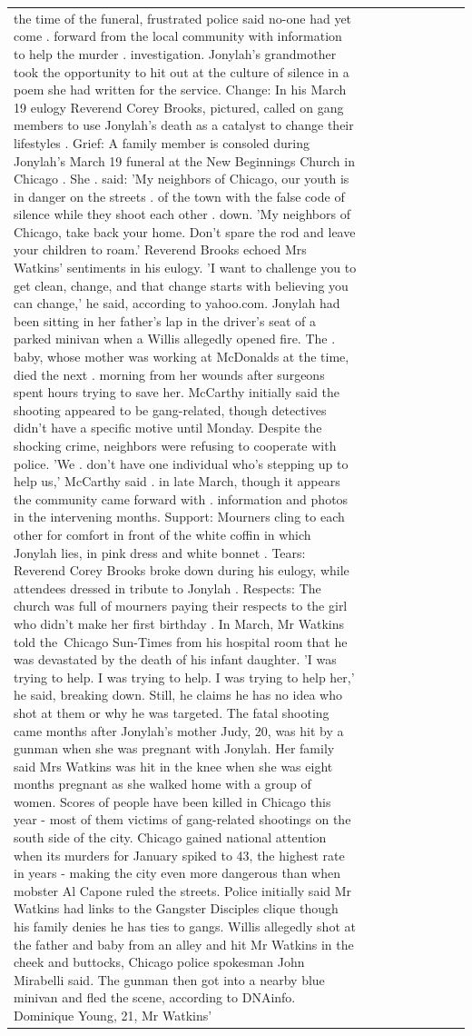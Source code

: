 \begin{table}[H]
\begin{tabular}{lllrlllll}
the time of the funeral, frustrated police said no-one had yet come . forward from the local community with information to help the murder . investigation. Jonylah's grandmother took the opportunity to hit out at the culture of silence in a poem she had written for the service. Change: In his March 19 eulogy Reverend Corey Brooks, pictured, called on gang members to use Jonylah's death as a catalyst to change their lifestyles . Grief: A family member is consoled during Jonylah's March 19 funeral at the New Beginnings Church in Chicago . She . said: 'My neighbors of Chicago, our youth is in danger on the streets . of the town with the false code of silence while they shoot each other . down. 'My neighbors of Chicago, take back your home. Don't spare the rod and leave your children to roam.' Reverend Brooks echoed Mrs Watkins' sentiments in his eulogy. 'I want to challenge you to get clean, change, and that change starts with believing you can change,' he said, according to yahoo.com. Jonylah had been sitting in her father's lap in the driver's seat of a parked minivan when a Willis allegedly opened fire. The . baby, whose mother was working at McDonalds at the time, died the next . morning from her wounds after surgeons spent hours trying to save her. McCarthy initially said the shooting appeared to be gang-related, though detectives didn't have a specific motive until Monday. Despite the shocking crime, neighbors were refusing to cooperate with police. 'We . don't have one individual who's stepping up to help us,' McCarthy said . in late March, though it appears the community came forward with . information and photos in the intervening months. Support: Mourners cling to each other for comfort in front of the white coffin in which Jonylah lies, in pink dress and white bonnet . Tears: Reverend Corey Brooks broke down during his eulogy, while attendees dressed in tribute to Jonylah . Respects: The church was full of mourners paying their respects to the girl who didn't make her first birthday . In March, Mr Watkins told the Chicago Sun-Times from his hospital room that he was devastated by the death of his infant daughter. 'I was trying to help. I was trying to help. I was trying to help her,' he said, breaking down. Still, he claims he has no idea who shot at them or why he was targeted. The fatal shooting came months after Jonylah's mother Judy, 20, was hit by a gunman when she was pregnant with Jonylah. Her family said Mrs Watkins was hit in the knee when she was eight months pregnant as she walked home with a group of women. Scores of people have been killed in Chicago this year - most of them victims of gang-related shootings on the south side of the city. Chicago gained national attention when its murders for January spiked to 43, the highest rate in years - making the city even more dangerous than when mobster Al Capone ruled the streets. Police initially said Mr Watkins had links to the Gangster Disciples clique though his family denies he has ties to gangs. Willis allegedly shot at the father and baby from an alley and hit Mr Watkins in the cheek and buttocks, Chicago police spokesman John Mirabelli said. The gunman then got into a nearby blue minivan and fled the scene, according to DNAinfo. Dominique Young, 21, Mr Watkins' 
\end{tabular}
\end{table}
